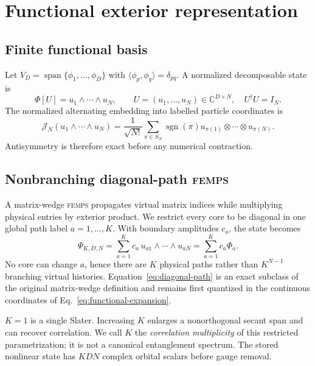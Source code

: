 \documentclass[11pt]{article}
\newcommand{\FEMPS}{\textnormal{\textsc{femps}}}
\begin{document}
\section{Functional exterior representation}

\subsection{Finite functional basis}

Let $V_D=\operatorname{span}\{\phi_1,\ldots,\phi_D\}$ with
$\langle\phi_p,\phi_q\rangle=\delta_{pq}$.  A normalized decomposable state is
\begin{equation}
 \Phi[U]=u_1\wedge\cdots\wedge u_N,\qquad
 U=(u_1,\ldots,u_N)\in\mathbb C^{D\times N},\quad U^\dagger U=I_N.
 \label{eq:slater}
\end{equation}
The normalized alternating embedding into labelled particle coordinates is
\begin{equation}
 \mathcal J_N(u_1\wedge\cdots\wedge u_N)
 =\frac{1}{\sqrt{N!}}\sum_{\pi\in S_N}\operatorname{sgn}(\pi)
 u_{\pi(1)}\otimes\cdots\otimes u_{\pi(N)}.
 \label{eq:alternating-embedding}
\end{equation}
Antisymmetry is therefore exact before any numerical contraction.

\subsection{Nonbranching diagonal-path \FEMPS}

A matrix-wedge \FEMPS{} propagates virtual matrix indices while multiplying
physical entries by exterior product.  We restrict every core to be diagonal
in one global path label $a=1,\ldots,K$.  With boundary amplitudes $c_a$, the
state becomes
\begin{equation}
 \Psi_{K,D,N}=\sum_{a=1}^{K}c_a\,
 u_{a1}\wedge\cdots\wedge u_{aN}
 =\sum_{a=1}^{K}c_a\Phi_a.
 \label{eq:diagonal-path}
\end{equation}
No core can change $a$, hence there are $K$ physical paths rather than
$K^{N-1}$ branching virtual histories.  Equation~\eqref{eq:diagonal-path} is an
exact subclass of the original matrix-wedge definition and remains first
quantized in the continuous coordinates of Eq.~\eqref{eq:functional-expansion}.

$K=1$ is a single Slater.  Increasing $K$ enlarges a nonorthogonal secant span
and can recover correlation.  We call $K$ the \emph{correlation multiplicity}
of this restricted parametrization; it is not a canonical entanglement
spectrum.  The stored nonlinear state has $KDN$ complex orbital scalars before
gauge removal.
\end{document}
